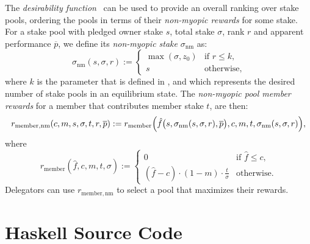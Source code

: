 \documentclass[11pt,a4paper,dvipsnames,twosided]{article}
\newcommand\pbar{\overline{p}}
\begin{document}
The \emph{desirability function}~\cite{...} can be used to provide an overall ranking over stake pools, ordering the
pools in terms of their \emph{non-myopic rewards} for some stake.
For a stake pool with pledged owner stake $s$, total stake $\sigma$, rank
$r$ and apparent performance $\pbar$, we define its \emph{non-myopic stake} $\sigma_\mathrm{nm}$ as:
\[
    \sigma_\mathrm{nm}(s,\sigma,r) :=
    \left\{
    \begin{array}{ll}
        \max(\sigma,z_0) &
        \text{if $r\leq k$,} \\
        s &
        \text{otherwise,}
    \end{array}
    \right.
\]
where $k$ is the parameter that is defined in \cite[Section 5.2]{delegation_design},
and which represents the desired number of stake pools in an equilibrium state.
%
The \emph{non-myopic pool member rewards}
for a member that contributes member stake $t$, are then:
\[
    r_\mathrm{member, nm}(c, m, s, \sigma, t, r, \pbar) :=
    r_\mathrm{member}\Bigl(\hat{f}\bigl(s,\sigma_\mathrm{nm}(s,\sigma, r),
    \pbar\bigr),
    c, m, t, \sigma_\mathrm{nm}(s,\sigma,r)\Bigr),
\label{eq:non-myopic-member-rewards}
\]
where
\[
    r_\mathrm{member}(\hat{f}, c, m, t, \sigma) :=
    \left\{
    \begin{array}{ll}
        \displaystyle 0 &
        \text{if $\hat{f}\leq c$,} \\
        \displaystyle (\hat{f} - c)\cdot(1-m)\cdot\frac{t}{\sigma} &
        \text{otherwise.}
    \end{array}
    \right.
\]
Delegators can use $r_\mathrm{member, nm}$ to select a pool
that maximizes their rewards.

\section{Haskell Source Code}

\begin{comment}
  Include the Haskell source code here.
\end{comment}

\begin{comment}
  Check for missing references.
\end{comment}



\end{document}
